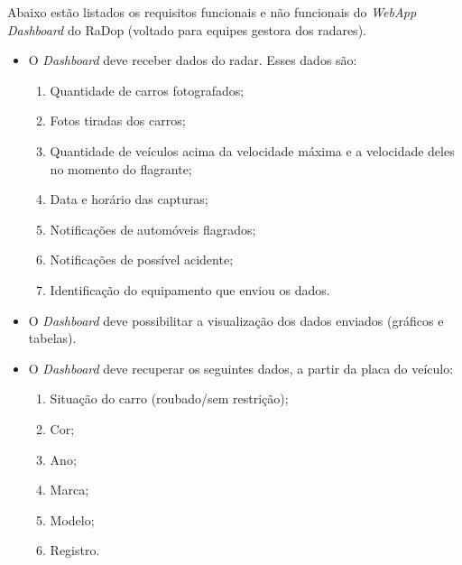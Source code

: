 Abaixo estão listados os requisitos funcionais e não funcionais do \textit{WebApp Dashboard} do RaDop (voltado para equipes gestora dos radares).

\begin{itemize}
    \item O \textit{Dashboard} deve receber dados do radar. Esses dados são:
    \begin{enumerate}
        \item Quantidade de carros fotografados;
        \item Fotos tiradas dos carros;
        \item Quantidade de veículos acima da velocidade máxima e a velocidade deles no momento do flagrante;
        \item Data e horário das capturas;
        \item Notificações de automóveis flagrados;
        \item Notificações de possível acidente;
        \item Identificação do equipamento que enviou os dados.
    \end{enumerate}
\end{itemize}

\begin{itemize}
    \item O \textit{Dashboard} deve possibilitar a visualização dos dados enviados (gráficos e tabelas).
\end{itemize}

\begin{itemize}
    \item O \textit{Dashboard} deve recuperar os seguintes dados, a partir da placa do veículo:
    \begin{enumerate}
        \item Situação do carro (roubado/sem restrição);
        \item Cor;
        \item Ano;
        \item Marca;
        \item Modelo;
        \item Registro.
    \end{enumerate}
\end{itemize}

